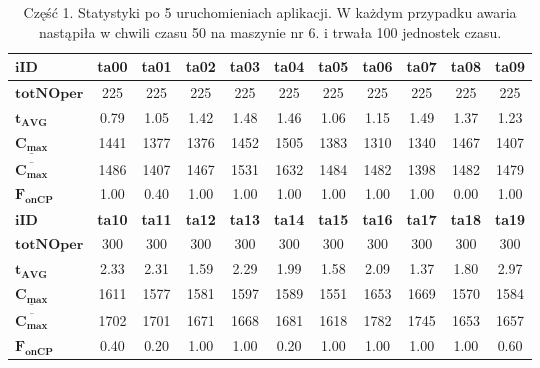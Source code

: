\documentclass[printmode,oneside]{mgr}
\begin{document}
\begin{table}[ht]
\renewcommand{\arraystretch}{1.2}
\begin{tabularx}{\textwidth}{|X|c|c|c|c|c|c|c|c|c|c|}
\hline
$\mathbf{iID}$ & \textbf{ta00} & \textbf{ta01} & \textbf{ta02} & \textbf{ta03} & \textbf{ta04} & \textbf{ta05} & \textbf{ta06} & \textbf{ta07} & \textbf{ta08} & \textbf{ta09}\\
\hline
$\mathbf{totNOper}$ & 225 & 225 & 225 & 225 & 225 & 225 & 225 & 225 & 225 & 225\\
\hline
$\mathbf{t_{AVG}}$ & 0.79 & 1.05 & 1.42 & 1.48 & 1.46 & 1.06 & 1.15 & 1.49 & 1.37 & 1.23\\
\hline
$\mathbf{\underline{C_{max}}}$ & 1441 & 1377 & 1376 & 1452 & 1505 & 1383 & 1310 & 1340 & 1467 & 1407\\
\hline
$\mathbf{\overline{C_{max}}}$ & 1486 & 1407 & 1467 & 1531 & 1632 & 1484 & 1482 & 1398 & 1482 & 1479\\
\hline
$\mathbf{F_{onCP}}$ & 1.00 & 0.40 & 1.00 & 1.00 & 1.00 & 1.00 & 1.00 & 1.00 & 0.00 & 1.00\\
\hline
\hline
$\mathbf{iID}$ & \textbf{ta10} & \textbf{ta11} & \textbf{ta12} & \textbf{ta13} & \textbf{ta14} & \textbf{ta15} & \textbf{ta16} & \textbf{ta17} & \textbf{ta18} & \textbf{ta19}\\
\hline
$\mathbf{totNOper}$ & 300 & 300 & 300 & 300 & 300 & 300 & 300 & 300 & 300 & 300\\
\hline
$\mathbf{t_{AVG}}$ & 2.33 & 2.31 & 1.59 & 2.29 & 1.99 & 1.58 & 2.09 & 1.37 & 1.80 & 2.97\\
\hline
$\mathbf{\underline{C_{max}}}$ & 1611 & 1577 & 1581 & 1597 & 1589 & 1551 & 1653 & 1669 & 1570 & 1584\\
\hline
$\mathbf{\overline{C_{max}}}$ & 1702 & 1701 & 1671 & 1668 & 1681 & 1618 & 1782 & 1745 & 1653 & 1657\\
\hline
$\mathbf{F_{onCP}}$ & 0.40 & 0.20 & 1.00 & 1.00 & 0.20 & 1.00 & 1.00 & 1.00 & 1.00 & 0.60\\
\hline
\end{tabularx}
\caption{Część 1. Statystyki po 5 uruchomieniach aplikacji. W każdym przypadku awaria nastąpiła w chwili czasu 50 na maszynie nr 6. i trwała 100 jednostek czasu.}
\label{tab_res_one}
\renewcommand{\arraystretch}{1.0}
\end{table}
%
\end{document}
